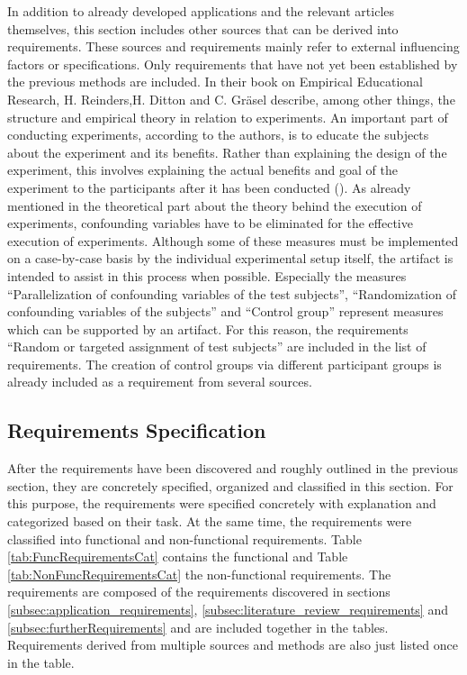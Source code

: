   In addition to already developed applications and the relevant articles themselves, this section includes other sources that can be derived into requirements. These sources and requirements mainly refer to external influencing factors or specifications. Only requirements that have not yet been established by the previous methods are included.  
  In their book on Empirical Educational Research, H. Reinders,H. Ditton and C. Gräsel describe, among other things, the structure and empirical theory in relation to experiments. An important part of conducting experiments, according to the authors, is to educate the subjects about the experiment and its benefits. Rather than explaining the design of the experiment, this involves explaining the actual benefits and goal of the experiment to the participants after it has been conducted (\cite{Gniewosz.2011}). As already mentioned in the theoretical part about the theory behind the execution of experiments, confounding variables have to be eliminated for the effective execution of experiments. Although some of these measures must be implemented on a case-by-case basis by the individual experimental setup itself, the artifact is intended to assist in this process when possible. Especially the measures \enquote{Parallelization of confounding variables of the test subjects}, \enquote{Randomization of confounding variables of the subjects} and \enquote{Control group} represent measures which can be supported by an artifact. For this reason, the requirements \enquote{Random or targeted assignment of test subjects} are included in the list of requirements. The creation of control groups via different participant groups is already included as a requirement from several sources.


\subsection{Requirements Specification}\label{subsec:reqSpec}

After the requirements have been discovered and roughly outlined in the previous section, they are concretely specified, organized and classified in this section. For this purpose, the requirements were specified concretely with explanation and categorized based on their task. At the same time, the requirements were classified into functional and non-functional requirements. Table \ref{tab:FuncRequirementsCat} contains the functional and Table \ref{tab:NonFuncRequirementsCat} the non-functional requirements. The requirements are composed of the requirements discovered in sections \ref{subsec:application_requirements}, \ref{subsec:literature_review_requirements} and \ref{subsec:furtherRequirements} and are included together in the tables. Requirements derived from multiple sources and methods are also just listed once in the table. 

